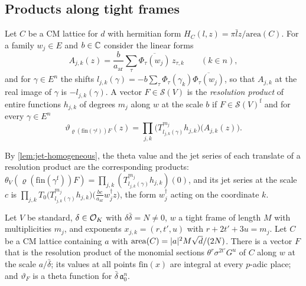 \subsection{Products along tight frames}\label{ss:resolution-products}
Let $C$ be a CM lattice for $d$ with hermitian form $H_C(l,z)=\pi\bar lz/\mathrm{area}(C)$. For a
family $w_j\in E$ and $b\in\mathbb{C}$ consider the linear forms
\[
  A_{j,k}(z)=\frac b{a_{\mathrm{ar}}}\sum_\tau\overline{\Phi_\tau(w_j)}\,z_{\tau,k}\qquad(k\in n),
\]
and for $\gamma\in E^n$ the shifts $l_{j,k}(\gamma)=-b\sum_\tau\Phi_\tau(\gamma_k)\overline{\Phi_\tau(w_j)}$,
so that $A_{j,k}$ at the real image of $\gamma$ is $-l_{j,k}(\gamma)$. A vector $F\in\mathcal S(V)$ is
the \emph{resolution product} of entire functions $h_{j,k}$ of degrees $m_j$ along $w$ at the scale
$b$ if $F\in\mathcal S(V)^{\mathrm f}$ and for every $\gamma\in E^n$
\[
  \vartheta_{\varrho(\mathrm{fin}(\gamma^{\mathrm f}))F}(z)=\prod_{j,k}\bigl(T^{m_j}_{l_{j,k}(\gamma)}h_{j,k}\bigr)
  \bigl(A_{j,k}(z)\bigr).
\]

By \cref{lem:jet-homogeneous}, the theta value and the jet series of each translate of a resolution
product are the corresponding products: $\theta_V(\varrho(\mathrm{fin}(\gamma^{\mathrm f}))F)=
\prod_{j,k}(T^{m_j}_{l_{j,k}(\gamma)}h_{j,k})(0)$, and its jet series at the scale $c$ is
$\prod_{j,k}T_0\bigl(T^{m_j}_{l_{j,k}(\gamma)}h_{j,k}\bigr)\bigl(\frac{bc}{a_{\mathrm{ar}}}w_j^\dagger z\bigr)$,
the form $w_j^\dagger$ acting on the coordinate $k$.

\begin{theorem}\label{thm:resolution-product}
Let $V$ be standard, $\delta\in\mathcal{O}_K$ with $\delta\bar\delta=N\ne0$, $w$ a tight frame of length $M$ with
multiplicities $m_j$, and exponents $x_{j,k}=(r,t',u)$ with $r+2t'+3u=m_j$. Let $C$ be a CM lattice
containing $a$ with $\mathrm{area}(C)=\lvert a\rvert^2M\sqrt d/(2N)$. There is a vector $F$ that is the
resolution product of the monomial sections $\theta^r\sigma^{2t'}G^u$ of $C$ along $w$ at the scale
$a/\bar\delta$; its values at all points $\mathrm{fin}(x)$ are integral at every $p$-adic place; and
$\vartheta_F$ is a theta function for $\bar\delta\,\mathfrak a_0^n$.
\end{theorem}

